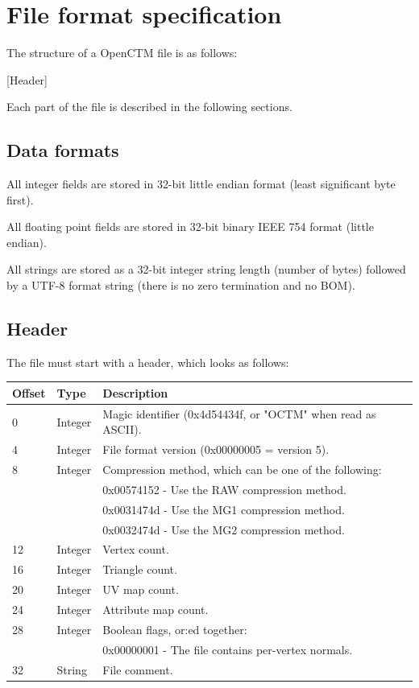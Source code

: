 
\chapter{File format specification}
The structure of a OpenCTM file is as follows:

[Header]

Each part of the file is described in the following sections.

\section{Data formats}
All integer fields are stored in 32-bit little endian format (least significant
byte first).

All floating point fields are stored in 32-bit binary IEEE 754 format (little
endian).

All strings are stored as a 32-bit integer string length (number of bytes)
followed by a UTF-8 format string (there is no zero termination and no BOM).


\section{Header}
The file must start with a header, which looks as follows:

\begin{tabular}{|l|l|l|}\hline
\textbf{Offset} &  \textbf{Type} & \textbf{Description}\\ \hline
0 & Integer & Magic identifier (0x4d54434f, or "OCTM" when read as ASCII).\\ \hline
4 & Integer & File format version (0x00000005 = version 5).\\ \hline
8 & Integer & Compression method, which can be one of the following:\\
 & & 0x00574152 - Use the RAW compression method.\\
 & & 0x0031474d - Use the MG1 compression method.\\
 & & 0x0032474d - Use the MG2 compression method.\\ \hline
12 & Integer & Vertex count.\\ \hline
16 & Integer & Triangle count.\\ \hline
20 & Integer & UV map count.\\ \hline
24 & Integer & Attribute map count.\\ \hline
28 & Integer & Boolean flags, or:ed together:\\
 & & 0x00000001 - The file contains per-vertex normals.\\ \hline
32 & String & File comment.\\ \hline
\end{tabular}

